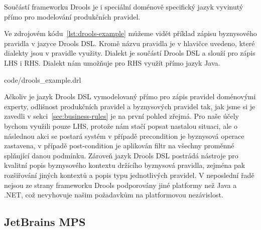 Součástí frameworku Drools je i speciální doménově specifický jazyk vyvinutý přímo
pro modelování produkčních pravidel.

Ve zdrojovém kódu~\ref{lst:drools-example} můžeme vidět příklad zápisu
byznysového pravidla v jazyce Drools DSL. Kromě názvu pravidla je v hlavičce
uvedeno, které dialekty jsou v pravidle využity. Dialekt  je součástí
Drools \gls{DSL} a slouží pro zápis \gls{LHS} i \gls{RHS}. Dialekt 
nám umožňuje pro \gls{RHS} využít přímo jazyk Java.

%


{code/drools_example.drl}

Ačkoliv je jazyk Drools \gls{DSL} vymodelovaný přímo pro zápis pravidel doménovými experty,
odlišnost produkčních pravidel a byznysových pravidel tak, jak jsme si je zavedli v sekci~\ref{sec:business-rules}
je na první pohled zřejmá. Pro naše účely bychom využili pouze \gls{LHS}, protože nám stačí
popsat nastalou situaci, ale o následnou akci se postará systém \textendash v případě
precondition je byznysová operace zastavena, v případě post-condition je aplikován filtr
na všechny proměnné splňující danou podmínku. Zároveň jazyk Drools \gls{DSL} postrádá
nástroje pro kvalitní popis byznysového kontextu držícího byznysová pravidla,
zejména pak rozšiřování jiných kontextů a popis typu jednotlivých pravidel.
V neposlední řadě nejsou ze strany frameworku Drools podporovány jiné platformy než
Java a .NET, což nevyhovuje našim požadavkům na platformovou nezávislost.

\subsection{JetBrains MPS}

